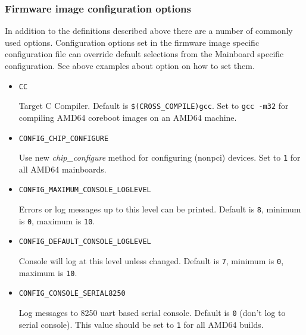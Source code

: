 \documentclass[titlepage,12pt]{article}
\begin{document}
\subsubsection{Firmware image configuration options}
In addition to the definitions described above there are a number of
commonly used options. Configuration options set in the firmware image
specific configuration file can override default selections from the
Mainboard specific configuration.  See above examples about
option on how to set them.

\begin{itemize}

\item \begin{verbatim}CC\end{verbatim}

Target C Compiler. Default is \texttt{\$(CROSS\_COMPILE)gcc}. Set to
\texttt{gcc -m32} for compiling AMD64 coreboot images on an AMD64
machine.

\item \begin{verbatim}CONFIG_CHIP_CONFIGURE \end{verbatim}

Use new \textit{chip\_configure} method for configuring (nonpci)
devices. Set to \texttt{1} for all AMD64 mainboards.

\item \begin{verbatim}CONFIG_MAXIMUM_CONSOLE_LOGLEVEL\end{verbatim}

Errors or log messages up to this level can be printed. Default is
\texttt{8}, minimum is \texttt{0}, maximum is \texttt{10}.

\item \begin{verbatim}CONFIG_DEFAULT_CONSOLE_LOGLEVEL\end{verbatim}

Console will log at this level unless changed. Default is \texttt{7},
minimum is \texttt{0}, maximum is \texttt{10}.

\item \begin{verbatim}CONFIG_CONSOLE_SERIAL8250\end{verbatim}

Log messages to 8250 uart based serial console. Default is \texttt{0}
(don't log to serial console). This value should be set to \texttt{1}
for all AMD64 builds.


\end{itemize}
\end{document}
